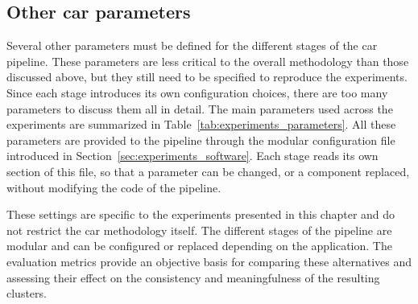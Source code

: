\subsection{Other \gls{car} parameters}

Several other parameters must be defined for the different stages of the \gls{car} pipeline.
These parameters are less critical to the overall methodology than those discussed above, but they still need to be specified to reproduce the experiments.
Since each stage introduces its own configuration choices, there are too many parameters to discuss them all in detail.
The main parameters used across the experiments are summarized in Table~\ref{tab:experiments_parameters}.
All these parameters are provided to the pipeline through the modular configuration file introduced in Section~\ref{sec:experiments_software}.
Each stage reads its own section of this file, so that a parameter can be changed, or a component replaced, without modifying the code of the pipeline.



These settings are specific to the experiments presented in this chapter and do not restrict the \gls{car} methodology itself.
The different stages of the pipeline are modular and can be configured or replaced depending on the application.
The evaluation metrics provide an objective basis for comparing these alternatives and assessing their effect on the consistency and meaningfulness of the resulting clusters.
